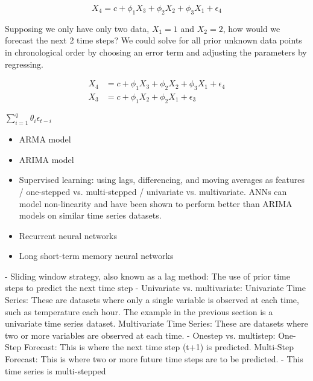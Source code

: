 \documentclass[11pt, oneside]{article}
\begin{document}
\begin{equation}
X_4 = c + \phi_1 X_{3} + \phi_2 X_{2} + \phi_3 X_{1} + \epsilon_4
\end{equation}

Supposing we only have only two data, $X_1=1$ and $X_2=2$, how would we forecast the next 2 time steps? We could solve for all prior unknown data points in chronological order by choosing an error term and adjusting the parameters by regressing.

\begin{equation}
  \begin{split}
    X_4 &= c + \phi_1 X_{3} + \phi_2 X_{2} + \phi_3 X_{1} + \epsilon_4 \\
    X_3 &= c + \phi_1 X_{2} + \phi_2 X_{1} + \epsilon_3
  \end{split}
\end{equation}

$\sum_{i=1}^q \theta_i \epsilon_{t-i}$

\begin{itemize}
  \item{ARMA model}
  \item{ARIMA model}
  \item{Supervised learning: using lags, differencing, and moving averages as features / one-stepped vs. multi-stepped / univariate vs. multivariate. ANNs can model non-linearity and have been shown to perform better than ARIMA models on similar time series datasets.}
  \item{Recurrent neural networks}
  \item{Long short-term memory neural networks}
\end{itemize}

- Sliding window strategy, also known as a lag method: The use of prior time steps to predict the next time step
- Univariate vs. multivariate: Univariate Time Series: These are datasets where only a single variable is observed at each time, such as temperature each hour. The example in the previous section is a univariate time series dataset. Multivariate Time Series: These are datasets where two or more variables are observed at each time.
- Onestep vs. multistep: One-Step Forecast: This is where the next time step (t+1) is predicted. Multi-Step Forecast: This is where two or more future time steps are to be predicted.
- This time series is multi-stepped
\end{document}
